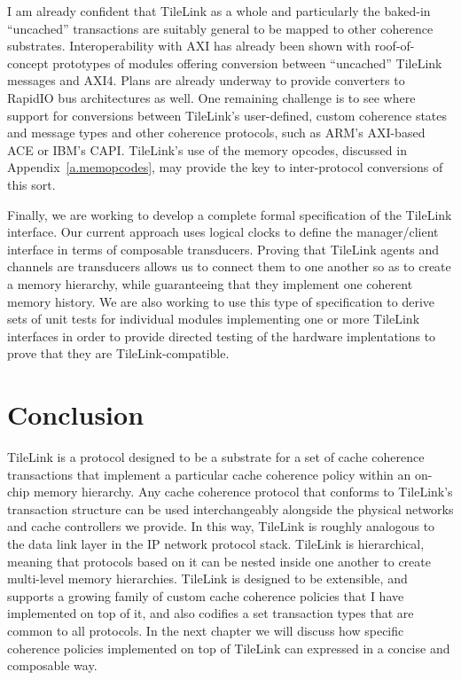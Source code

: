 I am already confident that TileLink as a whole and particularly the baked-in ``uncached'' transactions are suitably general to be mapped to 
other coherence substrates.
Interoperability with AXI has already been shown with roof-of-concept prototypes of modules offering conversion between ``uncached'' TileLink messages and AXI4.
Plans are already underway to provide converters to RapidIO bus architectures as well.
One remaining challenge is to see where support for conversions between TileLink's user-defined, custom coherence states and message types and other coherence protocols,
such as ARM's AXI-based ACE or IBM's CAPI.
TileLink's use of the memory opcodes, discussed in Appendix~\ref{a.memopcodes}, may provide the key to inter-protocol conversions of this sort.

Finally, we are working to develop a complete formal specification of the TileLink interface.
Our current approach uses logical clocks to define the manager/client interface in terms of composable transducers.
Proving that TileLink agents and channels are transducers allows us to connect them to one another so as to create a memory hierarchy,
while guaranteeing that they implement one coherent memory history.
We are also working to use this type of specification to derive sets of unit tests for individual modules implementing one or more TileLink interfaces
in order to provide directed testing of the hardware implentations to prove that they are TileLink-compatible.

\section{Conclusion}

TileLink is a protocol designed to be a substrate for a set of cache coherence transactions
that implement a particular cache coherence policy within an on-chip memory hierarchy.
Any cache coherence protocol that conforms to TileLink's transaction structure can be used interchangeably alongside the physical networks and cache controllers we provide.
In this way, TileLink is roughly analogous to the data link layer in the IP network protocol stack.
TileLink is hierarchical, meaning that protocols based on it can be nested inside one another to create multi-level memory hierarchies.
TileLink is designed to be extensible, and supports a growing family of custom cache coherence policies that I have implemented on top of it,
and also codifies a set transaction types that are common to all protocols.
In the next chapter we will discuss how specific coherence policies implemented on top of TileLink can expressed in a concise and composable way.


